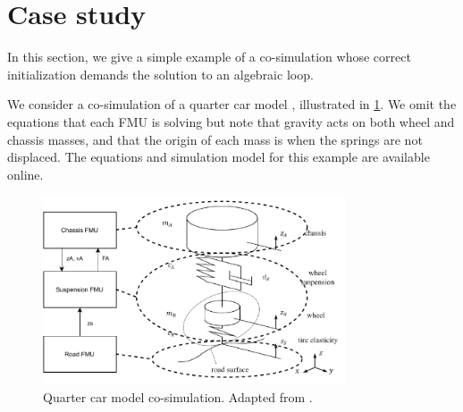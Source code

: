 \section{Case study}


In this section, we give a simple example of a co-simulation whose correct initialization demands the solution to an algebraic loop.

We consider a co-simulation of a quarter car model \cite[Section 6.4]{Schramm2014}, illustrated in \cref{fig:quarter_car}.
We omit the equations that each FMU is solving but note that gravity acts on both wheel and chassis masses, and that the origin of each mass is when the springs are not displaced.
The equations and simulation model for this example are available online. 

\begin{figure}[htb]
    \centering
    \includegraphics[width=0.8\textwidth]{images/quarter_car.pdf}
    \caption{Quarter car model co-simulation. Adapted from \cite[Section 6.4]{Schramm2014}. }
    \label{fig:quarter_car}
\end{figure}

